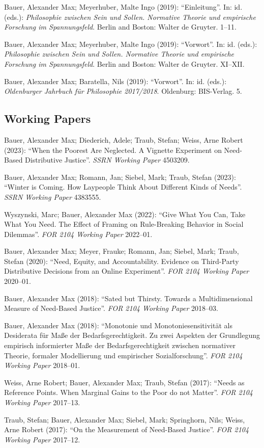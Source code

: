 \documentclass[a4paper,10pt]{article}
\newenvironment{literature}{%
   \parskip6pt\parindent0pt\raggedright
   \def\lititem{\hangindent=1cm\hangafter1}}{%
   \par\ignorespaces}
\begin{document}
\begin{literature}
\lititem Bauer, Alexander Max; Meyerhuber, Malte Ingo (2019): \enquote{Einleitung}. In: id. (eds.): \textit{Philosophie zwischen Sein und Sollen. Normative Theorie und empirische Forschung im Spannungsfeld}. Berlin and Boston: Walter de Gruyter. 1--11.

\lititem Bauer, Alexander Max; Meyerhuber, Malte Ingo (2019): \enquote{Vorwort}. In: id. (eds.): \textit{Philosophie zwischen Sein und Sollen. Normative Theorie und empirische Forschung im Spannungsfeld}. Berlin and Boston: Walter de Gruyter. XI--XII.

\lititem Bauer, Alexander Max; Baratella, Nils (2019): \enquote{Vorwort}. In: id. (eds.): \textit{Oldenburger Jahrbuch für Philosophie 2017/2018}. Oldenburg: BIS-Verlag. 5.
\end{literature}

\subsection*{Working Papers}
\begin{literature}
\lititem Bauer, Alexander Max; Diederich, Adele; Traub, Stefan; Weiss, Arne Robert (2023): \enquote{When the Poorest Are Neglected. A Vignette Experiment on Need-Based Distributive Justice}. \textit{SSRN Working Paper} 4503209.

\lititem Bauer, Alexander Max; Romann, Jan; Siebel, Mark; Traub, Stefan (2023): \enquote{Winter is Coming. How Laypeople Think About Different Kinds of Needs}. \textit{SSRN Working Paper} 4383555.

\lititem Wyszynski, Marc; Bauer, Alexander Max (2022): \enquote{Give What You Can, Take What You Need. The Effect of Framing on Rule-Breaking Behavior in Social Dilemmas}. \textit{FOR 2104 Working Paper} 2022--01.

\lititem Bauer, Alexander Max; Meyer, Frauke; Romann, Jan; Siebel, Mark; Traub, Stefan (2020): \enquote{Need, Equity, and Accountability. Evidence on Third-Party Distributive Decisions from an Online Experiment}. \textit{FOR 2104 Working Paper} 2020--01.

\lititem Bauer, Alexander Max (2018): \enquote{Sated but Thirsty. Towards a Multidimensional Measure of Need-Based Justice}. \textit{FOR 2104 Working Paper} 2018--03.

\lititem Bauer, Alexander Max (2018): \enquote{Monotonie und Monotoniesensitivität als Desiderata für Maße der Bedarfsgerechtigkeit. Zu zwei Aspekten der Grundlegung empirisch informierter Maße der Bedarfsgerechtigkeit zwischen normativer Theorie, formaler Modellierung und empirischer Sozialforschung}. \textit{FOR 2104 Working Paper} 2018--01.

\lititem Weiss, Arne Robert; Bauer, Alexander Max; Traub, Stefan (2017): \enquote{Needs as Reference Points. When Marginal Gains to the Poor do not Matter}. \textit{FOR 2104 Working Paper} 2017--13.

\lititem Traub, Stefan; Bauer, Alexander Max; Siebel, Mark; Springhorn, Nils; Weiss, Arne Robert (2017): \enquote{On the Measurement of Need-Based Justice}. \textit{FOR 2104 Working Paper} 2017--12.
\end{literature}
\end{document}
